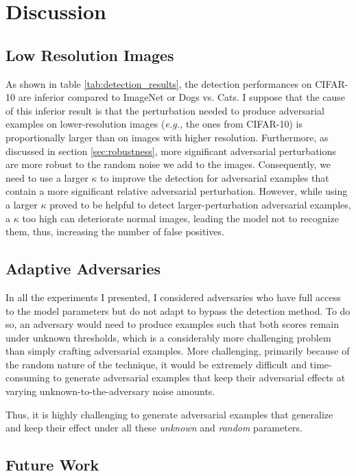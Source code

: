 \chapter{Discussion}
\label{discussion}
\overridetextsize

\section{Low Resolution Images}

As shown in table \ref{tab:detection_results}, the detection performances on
CIFAR-10 are inferior compared to ImageNet or Dogs vs. Cats. I suppose that the
cause of this inferior result is that the perturbation needed to produce
adversarial examples on lower-resolution images (\emph{e.g.,} the ones from
CIFAR-10) is proportionally larger than on images with higher resolution.
Furthermore, as discussed in section \ref{sec:robustness}, more significant
adversarial perturbations are more robust to the random noise we add to the
images. Consequently, we need to use a larger $\kappa$ to improve the detection
for adversarial examples that contain a more significant relative adversarial
perturbation. However, while using a larger $\kappa$ proved to be helpful to
detect larger-perturbation adversarial examples, a $\kappa$ too high can
deteriorate normal images, leading the model not to recognize them, thus,
increasing the number of false positives.

\section{Adaptive Adversaries}

In all the experiments I presented, I considered adversaries who have full
access to the model parameters but do not adapt to bypass the detection method.
To do so, an adversary would need to produce examples such that both scores
remain under unknown thresholds, which is a considerably more challenging
problem than simply crafting adversarial examples. More challenging, primarily
because of the random nature of the technique, it would be extremely difficult
and time-consuming to generate adversarial examples that keep their adversarial
effects at varying unknown-to-the-adversary noise amounts.

Thus, it is highly challenging to generate adversarial examples that generalize
and keep their effect under all these \emph{unknown} and \emph{random}
parameters.

\clearpage
\section{Future Work}

